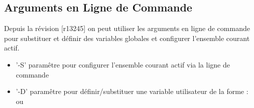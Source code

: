 \subsection{Arguments en Ligne de Commande}\label{sec:cmdline_args}
Depuis la révision [r13245] on peut utiliser les arguments en ligne de commande pour substituer et définir des variables globales et configurer l'ensemble courant actif.
\begin{itemize}
\item '-S' paramêtre pour configurer l'ensemble courant actif via la ligne de commande
\item '-D' paramêtre pour définir/substituer une variable utilisateur de la forme :\\
  ou 
\end{itemize}
